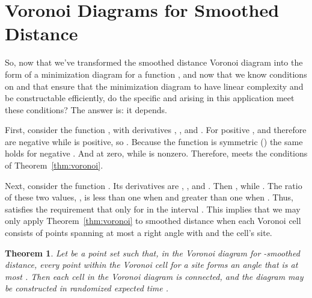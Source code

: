 \documentclass[10pt, conference, compsocconf]{IEEEtran}
\newtheorem{theorem}{Theorem}
\begin{document}
\section{Voronoi Diagrams for Smoothed Distance}

So, now that we've transformed the smoothed distance Voronoi diagram into the form of a minimization diagram for a function , and now that we know conditions on  and  that ensure that the minimization diagram to have linear complexity and be constructable efficiently, do the specific  and  arising in this application meet these conditions? The answer is: it depends.

First, consider the function , with derivatives
,
, and
.
For positive ,  and therefore  are negative while  is positive, so .
Because the function is symmetric () the same holds for negative .
And at zero,  while  is nonzero. Therefore,  meets the conditions of Theorem~\ref{thm:voronoi}.

Next, consider the function . Its derivatives are
,
, and
.
Then , while .
The ratio of these two values, , is less than one
when  and greater than one when . Thus,  satisfies the requirement that  only for  in the interval . This implies that we may only apply Theorem~\ref{thm:voronoi} to smoothed distance when each Voronoi cell consists of points spanning at most a right angle with  and the cell's site.

\begin{theorem}
\label{thm:smoothed}
Let  be a point set such that, in the Voronoi diagram for -smoothed distance, every point  within the Voronoi cell for a site  forms an angle  that is at most .  Then each cell in the Voronoi diagram is connected, and the diagram may be constructed in randomized expected time .
\end{theorem}
\end{document}
